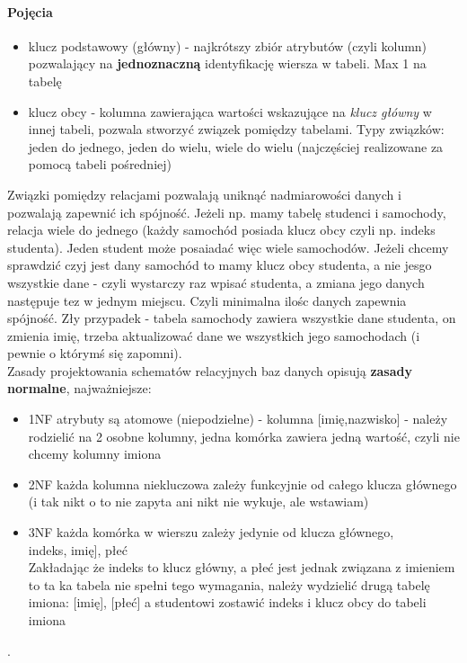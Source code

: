 \documentclass[a4paper,twoside]{report}
\begin{document}
\paragraph{Pojęcia}
\begin{itemize}
	\item klucz podstawowy (główny) - najkrótszy zbiór atrybutów (czyli kolumn) pozwalający na \textbf{jednoznaczną} identyfikację wiersza w tabeli. Max 1 na tabelę
	\item klucz obcy - kolumna zawierająca wartości wskazujące na \textit{klucz główny} w innej tabeli, pozwala stworzyć związek pomiędzy tabelami. Typy związków: jeden do jednego, jeden do wielu, wiele do wielu (najczęściej realizowane za pomocą tabeli pośredniej)
\end{itemize}
Związki pomiędzy relacjami pozwalają uniknąć nadmiarowości danych i pozwalają zapewnić ich spójność. Jeżeli np. mamy tabelę studenci i samochody, relacja wiele do jednego (każdy samochód posiada klucz obcy czyli np. indeks studenta). Jeden student może posaiadać więc wiele samochodów. Jeżeli chcemy sprawdzić czyj jest dany samochód to mamy klucz obcy studenta, a nie jesgo wszystkie dane - czyli wystarczy raz wpisać studenta, a zmiana jego danych następuje tez w jednym miejscu. Czyli minimalna ilośc danych zapewnia spójność. Zły przypadek - tabela samochody zawiera wszystkie dane studenta, on zmienia imię, trzeba aktualizować dane we wszystkich jego samochodach (i pewnie o którymś się zapomni).\\
Zasady projektowania schematów relacyjnych baz danych opisują \textbf{zasady normalne}, najważniejsze:
\begin{itemize}
	\item 1NF atrybuty są atomowe (niepodzielne) - kolumna [imię,nazwisko] - należy rodzielić na 2 osobne kolumny, jedna komórka zawiera jedną wartość, czyli nie chcemy kolumny imiona
		\item 2NF   każda kolumna niekluczowa zależy funkcyjnie od całego klucza głównego  (i tak nikt o to nie zapyta ani nikt nie wykuje, ale wstawiam)
	\item 3NF każda komórka w wierszu zależy jedynie od klucza głównego, \\
	\lbrack indeks\rbrack, \lbrack imię\rbrack], \lbrack płeć\rbrack  \\
	Zakładając że indeks to klucz główny, a płeć jest jednak związana z imieniem to ta ka tabela nie spełni tego wymagania, należy wydzielić drugą tabelę imiona: [imię], [płeć] a studentowi zostawić indeks i klucz obcy do tabeli imiona
\end{itemize} .
\end{document}
